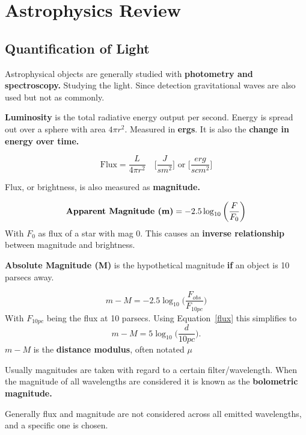 \section{Astrophysics Review}
\subsection{Quantification of Light}
Astrophysical objects are generally studied with \textbf{photometry and spectroscopy.} Studying the light. Since detection gravitational waves are also used but not as commonly.


\textbf{Luminosity} is the total radiative energy output per second. Energy is spread out over a sphere with area $4\pi r^{2}$. Measured in \textbf{ergs}. It is also the \textbf{change in energy over time. }

\begin{equation}
	\label{flux}
	\mbox{Flux}=\frac{L}{4\pi r^{2}}\quad \bigg[\frac{J}{sm^{2}}\bigg] \mbox{\ or } \bigg[\frac{erg}{s cm^{2}}\bigg]
\end{equation}

Flux, or brightness, is also measured as \textbf{magnitude.}

\begin{equation}
	\label{}
	\mbox{\textbf{Apparent Magnitude (m)}}=-2.5\log_{10}\bigg(\frac{F}{F_{0}}\bigg)
\end{equation}
With $F_{0}$ as flux of a star with mag 0. This causes an \textbf{inverse relationship} between magnitude and brightness.


\textbf{Absolute Magnitude (M)}  is the hypothetical magnitude \textbf{if} an object is 10 parsecs away. 



\begin{equation}
	\label{}
	m-M=-2.5\log_{10}\bigg(\frac{F_{obs}}{F_{10pc}}\bigg)
\end{equation}
With $F_{10pc}$ being the flux at 10 parsecs. Using Equation~\ref{flux} this simplifies to
\begin{equation}
	\label{}
	m-M=5\log_{10}\bigg(\frac{d}{10pc}\bigg).
\end{equation}
$m-M$ is the \textbf{distance modulus}, often notated $\mu$


\hfill
\hfill
Usually magnitudes are taken with regard to a certain filter/wavelength. When the magnitude of all wavelengths are considered it is known as the \textbf{bolometric magnitude.}


Generally flux and magnitude are not considered across all emitted wavelengths, and a specific one is chosen. 


